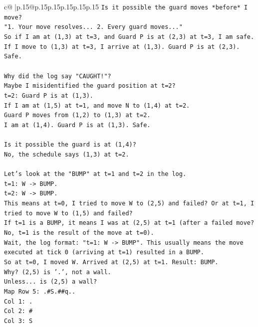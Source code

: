 \documentclass{article}
\begin{document}
{\begin{supertabular}{c@{$\;$}|p{.15\linewidth}@{}p{.15\linewidth}p{.15\linewidth}p{.15\linewidth}p{.15\linewidth}p{.15\linewidth}}
{{{\texttt{Is it possible the guard moves *before* I move?} \\
\texttt{"1. Your move resolves... 2. Every guard moves..."} \\
\texttt{So if I am at (1,3) at t=3, and Guard P is at (2,3) at t=3, I am safe.} \\
\texttt{If I move to (1,3) at t=3, I arrive at (1,3). Guard P is at (2,3). Safe.} \\
\\ 
\texttt{Why did the log say "CAUGHT!"?} \\
\texttt{Maybe I misidentified the guard position at t=2?} \\
\texttt{t=2: Guard P is at (1,3).} \\
\texttt{If I am at (1,5) at t=1, and move N to (1,4) at t=2.} \\
\texttt{Guard P moves from (1,2) to (1,3) at t=2.} \\
\texttt{I am at (1,4). Guard P is at (1,3). Safe.} \\
\\ 
\texttt{Is it possible the guard is at (1,4)?} \\
\texttt{No, the schedule says (1,3) at t=2.} \\
\\ 
\texttt{Let's look at the "BUMP" at t=1 and t=2 in the log.} \\
\texttt{t=1: W {-}> BUMP.} \\
\texttt{t=2: W {-}> BUMP.} \\
\texttt{This means at t=0, I tried to move W to (2,5) and failed? Or at t=1, I tried to move W to (1,5) and failed?} \\
\texttt{If t=1 is a BUMP, it means I was at (2,5) at t=1 (after a failed move? No, t=1 is the result of the move at t=0).} \\
\texttt{Wait, the log format: "t=1: W {-}> BUMP". This usually means the move executed at tick 0 (arriving at t=1) resulted in a BUMP.} \\
\texttt{So at t=0, I moved W. Arrived at (2,5) at t=1. Result: BUMP.} \\
\texttt{Why? (2,5) is '.', not a wall.} \\
\texttt{Unless... is (2,5) a wall?} \\
\texttt{Map Row 5: .\#S.\#\#q..} \\
\texttt{Col 1: .} \\
\texttt{Col 2: \#} \\
\texttt{Col 3: S} \\
}}}
\end{supertabular}}
\end{document}
